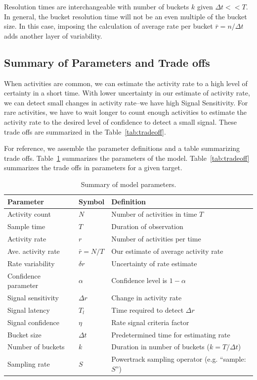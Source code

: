 \documentclass{article}
\begin{document}
Resolution times are interchangeable with number of buckets $k$ given $\Delta t << T$.  In general, the
bucket resolution time will not be an even multiple of the bucket size.  In this case, imposing the calculation
of average rate per bucket $\bar{r} = n/\Delta t$ adds another layer of variability.

\subsection{Summary of Parameters and Trade offs}

When activities are common, we can estimate the activity rate to a high level of certainty in a short time. With lower
uncertainty in our estimate of activity rate, we can detect small changes in activity rate--we have high Signal
Sensitivity. For rare activities, we have to wait longer to count enough activities to estimate the activity rate to
the desired level of confidence to detect a small signal. These trade offs are summarized in the Table~\ref{tab:tradeoff}.

For reference, we assemble the parameter definitions and a table summarizing trade offs.  Table~\ref{tab:summary}
summarizes the parameters of the model. Table~\ref{tab:tradeoff} summarizes the trade offs in parameters for
a given target.

\begin{table} [!h]
    \begin{tabular}{p{3.5cm}| p{1.5cm}|p{5.65cm}}
     \hline
Parameter  & Symbol & Definition \\
\hline	
Activity count & $N$ & Number of activities in time $T$\\
Sample time & $T$	& Duration of observation\\
Activity rate & $r$	& Number of activities per time \\
Ave. activity rate & $\bar{r} = N/T$ & Our estimate of average activity rate \\
Rate variability & $\delta r$	& Uncertainty of rate estimate \\
Confidence parameter & $\alpha$ & Confidence level is $1-\alpha$\\
Signal sensitivity & $\Delta r$ & Change in activity rate \\
Signal latency & $T_l$ & Time required to detect $\Delta r$  \\
Signal confidence & $\eta$	& Rate signal criteria factor \\
Bucket size & $\Delta t$ & Predetermined time for estimating rate \\
Number of buckets & $k$ & Duration in number of  buckets ($k=T/\Delta t$) \\
Sampling rate & $S$	& Powertrack sampling operator (e.g. ``sample:$S$'') \\
\hline
\end{tabular}
\caption{Summary of model parameters.}
\label{tab:summary}
\end{table}
\end{document}
